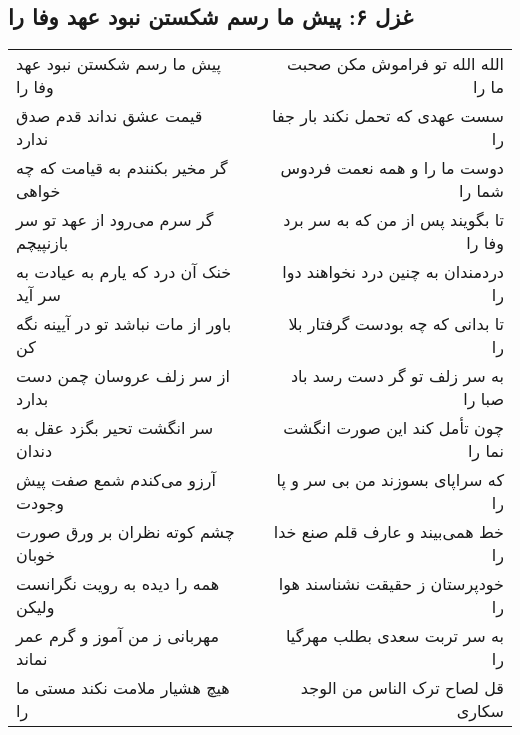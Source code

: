 \begin{center}
\section*{غزل ۶: پیش ما رسم شکستن نبود عهد وفا را}
\label{sec:006}
\begin{longtable}{l p{0.5cm} r}
پیش ما رسم شکستن نبود عهد وفا را
&&
الله الله تو فراموش مکن صحبت ما را
\\
قیمت عشق نداند قدم صدق ندارد
&&
سست عهدی که تحمل نکند بار جفا را
\\
گر مخیر بکنندم به قیامت که چه خواهی
&&
دوست ما را و همه نعمت فردوس شما را
\\
گر سرم می‌رود از عهد تو سر بازنپیچم
&&
تا بگویند پس از من که به سر برد وفا را
\\
خنک آن درد که یارم به عیادت به سر آید
&&
دردمندان به چنین درد نخواهند دوا را
\\
باور از مات نباشد تو در آیینه نگه کن
&&
تا بدانی که چه بودست گرفتار بلا را
\\
از سر زلف عروسان چمن دست بدارد
&&
به سر زلف تو گر دست رسد باد صبا را
\\
سر انگشت تحیر بگزد عقل به دندان
&&
چون تأمل کند این صورت انگشت نما را
\\
آرزو می‌کندم شمع صفت پیش وجودت
&&
که سراپای بسوزند من بی سر و پا را
\\
چشم کوته نظران بر ورق صورت خوبان
&&
خط همی‌بیند و عارف قلم صنع خدا را
\\
همه را دیده به رویت نگرانست ولیکن
&&
خودپرستان ز حقیقت نشناسند هوا را
\\
مهربانی ز من آموز و گرم عمر نماند
&&
به سر تربت سعدی بطلب مهرگیا را
\\
هیچ هشیار ملامت نکند مستی ما را
&&
قل لصاح ترک الناس من الوجد سکاری
\\
\end{longtable}
\end{center}
